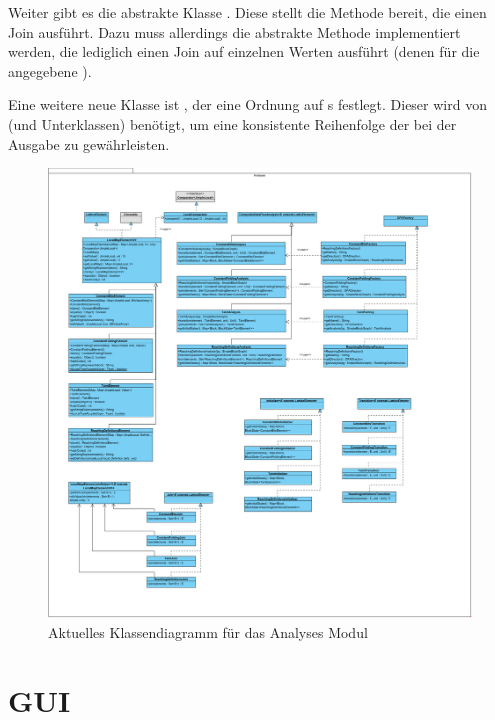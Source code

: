 Weiter gibt es die abstrakte Klasse .
Diese stellt die Methode  bereit, die einen Join ausführt.
Dazu muss allerdings die abstrakte Methode  implementiert werden, die lediglich einen Join auf einzelnen Werten ausführt (denen für die angegebene ).

Eine weitere neue Klasse ist , der eine Ordnung auf s festlegt. Dieser wird von  (und Unterklassen) benötigt, um eine konsistente Reihenfolge der  bei der Ausgabe zu gewährleisten.

\begin{figure}[H]
	\caption{Aktuelles Klassendiagramm für das Analyses Modul}
	\centering
	\includegraphics[width=1.0\textwidth]{Aenderungen/Klassendiagramme/Analyses_Impl.png}
\end{figure}

\newpage
\section{GUI}

